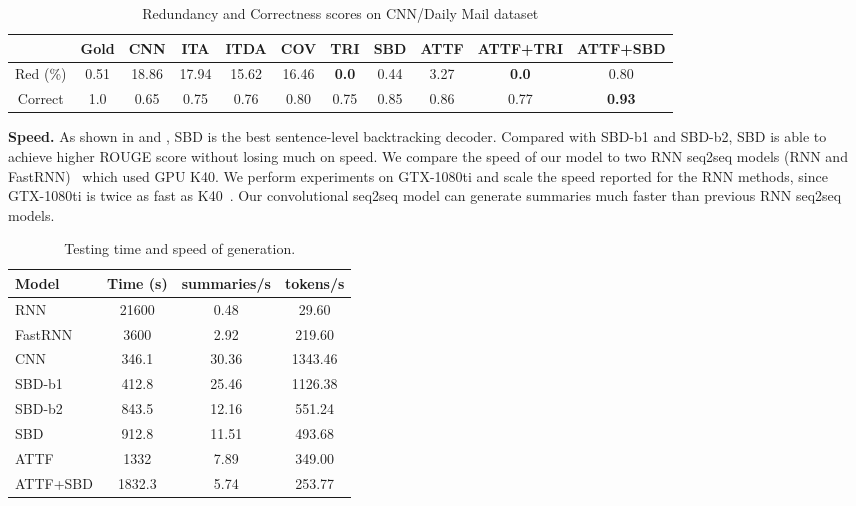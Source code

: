 \begin{table}[th]
	\centering
	\scriptsize
	\begin{tabular}{|c|c|c|c|c|c|c|c|c|c|c|}
		\hline
	            & Gold & CNN  & ITA & ITDA & COV & TRI & SBD & ATTF & ATTF+TRI & ATTF+SBD \\
		\hline
		Red (\%) & 0.51 & 18.86 & 17.94 & 15.62 & 16.46 & \bf 0.0 & 0.44 & 3.27 & \bf 0.0 & 0.80 \\
		Correct & 1.0 & 0.65 & 0.75 & 0.76 & 0.80 & 0.75 & 0.85 & 0.86 & 0.77 & \bf 0.93 \\
		\hline
	\end{tabular}
	\caption{Redundancy and Correctness scores on CNN/Daily Mail dataset}
	\label{tab:eval_cor}
\end{table}

\textbf{Speed.} 
As shown in  and , 
SBD is the best sentence-level backtracking decoder.
Compared with SBD-b1 and SBD-b2,
SBD is able to achieve higher ROUGE score without losing much on speed. 
We compare the speed of our model to two RNN 
seq2seq models (RNN and FastRNN)~\cite{SeeLM17, P18-1063}
which used GPU K40. 
We perform experiments on GTX-1080ti and scale the speed 
reported for the RNN methods,
since GTX-1080ti is twice as fast as K40~\cite{gehring2017convs2s}.
Our convolutional seq2seq model can 
generate summaries much faster than previous RNN seq2seq models.

\begin{table}[th]
\centering
\scriptsize
\begin{tabular}{|l|c|c|c|}
\hline
Model & Time (s) & summaries/s & tokens/s \\
\hline
RNN  &  21600 & 0.48 & 29.60 \\
FastRNN &  3600 & 2.92 & 219.60 \\
\hline
CNN &  346.1 & 30.36 & 1343.46 \\
SBD-b1 &  412.8 & 25.46 & 1126.38 \\
SBD-b2 &  843.5 & 12.16 & 551.24 \\
SBD &  912.8 & 11.51 & 493.68 \\
ATTF & 1332 & 7.89 &  349.00 \\
ATTF+SBD & 1832.3 & 5.74 &  253.77 \\
\hline
\end{tabular}
\caption{Testing time and speed of generation.}
\label{tab:eval_speed}
\end{table}


